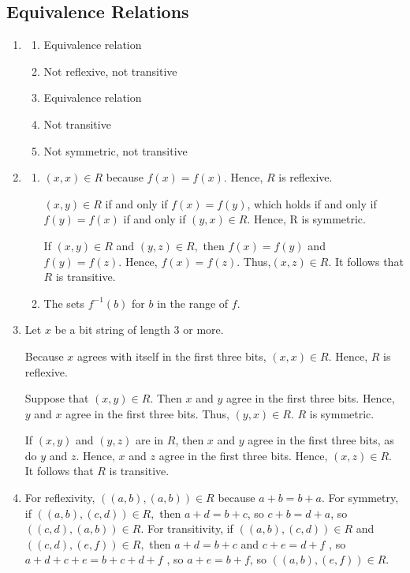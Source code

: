 \documentclass{../../cls/sig-alternate-05-2015}
\begin{document}
\subsection{Equivalence Relations}
\begin{enumerate}
\item
	\begin{enumerate}
		\item Equivalence relation \item Not reflexive, not transitive
		\item Equivalence relation \item Not transitive \item Not symmetric,
		not transitive
	\end{enumerate}
\item
	\begin{enumerate}
		\item  $(x, x) \in R $ because $f (x) = f (x)$. Hence, $R$ is reflexive.
		
		$(x, y) \in R$ if and only if $f (x) = f (y)$, which holds if and
		only if $f (y) = f (x)$ if and only if $(y, x) \in R.$ Hence, R is
		symmetric. 
		
		If $(x, y) \in R$ and $(y, z) \in R,$ then $f (x) = f (y)$
		and $f (y) = f (z)$. Hence, $f (x) = f (z)$. Thus,$ (x, z) \in R$.
		It follows that $R$ is transitive. 
		\item   The sets $f^{-1}(b)$ for $b$ in the range of $f$.
	\end{enumerate}

\item 
Let $x$ be a bit string of length 3 or more.

Because $x$ agrees with itself in the first three bits, $(x, x)\in R.$
Hence, $R$ is reflexive. 

Suppose that $(x, y) \in R.$ Then $x$ and $y$ agree in the first three bits. 
Hence, $y$ and $x$ agree in the first three bits. Thus, $(y, x)\in R$. $R$ is symmetric.

If $(x, y)$ and $(y, z)$ are in $R$, then
$x$ and $y$ agree in the first three bits, as do $y$ and $z$. Hence, $x$
and $z$ agree in the first three bits. Hence, $(x, z) \in R.$ It follows
that $R$ is transitive.

\item
For reflexivity,
$((a, b), (a, b))\in R$ because $a +b = b +a$. For symmetry, if
$((a, b), (c, d))\in R,$ then $a + d = b + c$, so $c + b = d + a$,
so $((c, d), (a, b))\in R.$ For transitivity, if $((a, b), (c, d)) \in R$
 and $((c, d), (e, f )) \in R,$ then $a+d = b+c$ and $c+e = d+f$ ,
so $a + d + c + e = b + c + d + f$ , so $a + e = b + f $,
so $((a, b), (e, f ))\in R.$ 


\end{enumerate}
\end{document}
